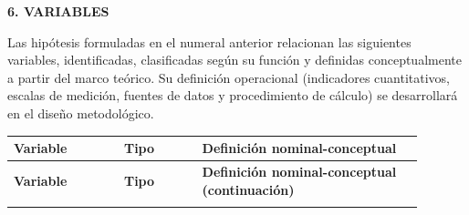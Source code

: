 \hypertarget{sec:variables}{}%
\begin{center}
    {\Large\bfseries 6. VARIABLES}
\end{center}
\vspace{1em}
Las hipótesis formuladas en el numeral anterior relacionan las siguientes variables, identificadas, clasificadas según su función y definidas conceptualmente a partir del marco teórico. Su definición operacional (indicadores cuantitativos, escalas de medición, fuentes de datos y procedimiento de cálculo) se desarrollará en el diseño metodológico.
\vspace{0.5em}
\begingroup
\small
\setlength{\tabcolsep}{5pt}
\begin{longtable}{|>{\raggedright\arraybackslash}p{0.24\linewidth}|>{\raggedright\arraybackslash}p{0.17\linewidth}|>{\raggedright\arraybackslash}p{0.48\linewidth}|}
\hline
\textbf{Variable} & \textbf{Tipo} & \textbf{Definición nominal-conceptual} \\ \hline
\endfirsthead

\hline
\textbf{Variable} & \textbf{Tipo} & \textbf{Definición nominal-conceptual (continuación)} \\ \hline
\endhead

\hline
\endfoot

\hline
\endlastfoot


\end{longtable}
